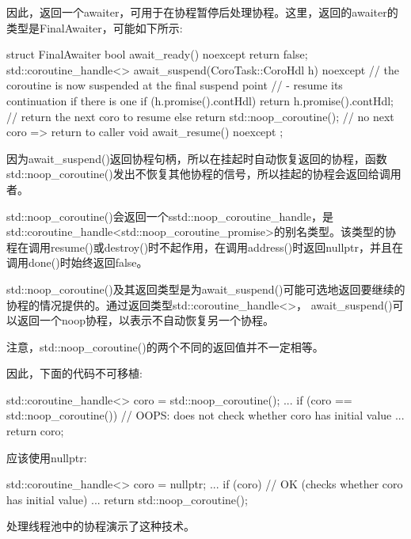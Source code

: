 因此，返回一个awaiter，可用于在协程暂停后处理协程。这里，返回的awaiter的类型是FinalAwaiter，可能如下所示:

\begin{cpp}
struct FinalAwaiter {
	bool await_ready() noexcept {
		return false;
	}
	std::coroutine_handle<> await_suspend(CoroTask::CoroHdl h) noexcept {
		// the coroutine is now suspended at the final suspend point
		// - resume its continuation if there is one
		if (h.promise().contHdl) {
			return h.promise().contHdl; // return the next coro to resume
		}
		else {
			return std::noop_coroutine(); // no next coro => return to caller
		}
	}
	void await_resume() noexcept {
	}
};
\end{cpp}

因为await\_suspend()返回协程句柄，所以在挂起时自动恢复返回的协程，函数std::noop\_coroutine()发出不恢复其他协程的信号，所以挂起的协程会返回给调用者。

std::noop\_coroutine()会返回一个sstd::noop\_coroutine\_handle，是std::coroutine\_handle<std::noop\_coroutine\_promise>的别名类型。该类型的协程在调用resume()或destroy()时不起作用，在调用address()时返回nullptr，并且在调用done()时始终返回false。

std::noop\_coroutine()及其返回类型是为await\_suspend()可能可选地返回要继续的协程的情况提供的。通过返回类型std::coroutine\_handle<>， await\_suspend()可以返回一个noop协程，以表示不自动恢复另一个协程。

注意，std::noop\_coroutine()的两个不同的返回值并不一定相等。

因此，下面的代码不可移植:

\begin{cpp}
std::coroutine_handle<> coro = std::noop_coroutine();
...
if (coro == std::noop_coroutine()) { // OOPS: does not check whether coro has initial value
	...
	return coro;
}
\end{cpp}

应该使用nullptr:

\begin{cpp}
std::coroutine_handle<> coro = nullptr;
...
if (coro) { // OK (checks whether coro has initial value)
	...
	return std::noop_coroutine();
}
\end{cpp}

处理线程池中的协程演示了这种技术。













